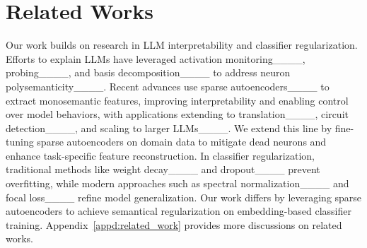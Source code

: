 \section{Related Works}
Our work builds on research in LLM interpretability and classifier regularization. Efforts to explain LLMs have leveraged activation monitoring____, probing____, and basis decomposition____ to address neuron polysemanticity____. Recent advances use sparse autoencoders____ to extract monosemantic features, improving interpretability and enabling control over model behaviors, with applications extending to translation____, circuit detection____, and scaling to larger LLMs____. We extend this line by fine-tuning sparse autoencoders on domain data to mitigate dead neurons and enhance task-specific feature reconstruction. In classifier regularization, traditional methods like weight decay____ and dropout____ prevent overfitting, while modern approaches such as spectral normalization____ and focal loss____ refine model generalization. Our work differs by leveraging sparse autoencoders to achieve semantical regularization on embedding-based classifier training. 
Appendix~\ref{appd:related_work} provides more discussions on related works.